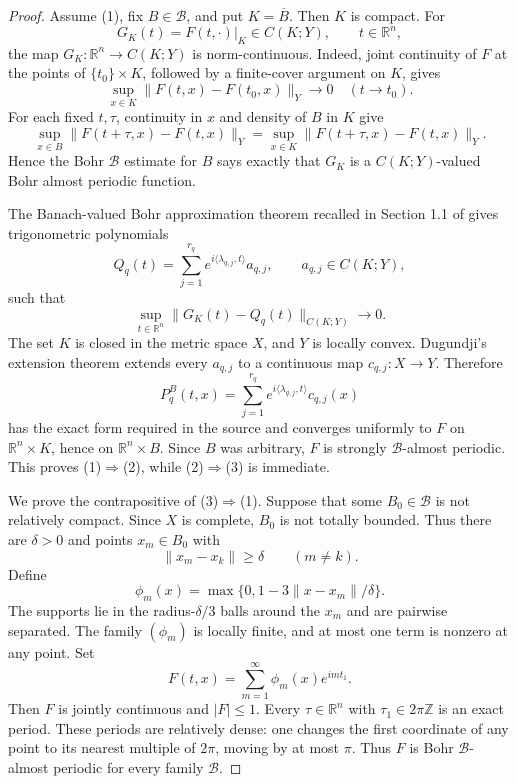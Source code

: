 \documentclass[11pt]{article}
\newcommand{\R}{\mathbb R}
\newcommand{\B}{\mathcal B}
\newcommand{\ip}[2]{\langle #1,#2\rangle}
\begin{document}
\begin{proof}
Assume (1), fix $B\in\B$, and put $K=\overline B$.  Then $K$ is compact.
For
\[
 G_K(t)=F(t,\cdot)|_K\in C(K;Y),\qquad t\in\R^n,
\]
the map $G_K:\R^n\to C(K;Y)$ is norm-continuous.  Indeed, joint continuity
of $F$ at the points of $\{t_0\}\times K$, followed by a finite-cover
argument on $K$, gives
\[
 \sup_{x\in K}\|F(t,x)-F(t_0,x)\|_Y\longrightarrow0
 \quad(t\to t_0).
\]
For each fixed $t,\tau$, continuity in $x$ and density of $B$ in $K$ give
\[
 \sup_{x\in B}\|F(t+\tau,x)-F(t,x)\|_Y
 =\sup_{x\in K}\|F(t+\tau,x)-F(t,x)\|_Y.
\]
Hence the Bohr $\B$ estimate for $B$ says exactly that $G_K$ is a
$C(K;Y)$-valued Bohr almost periodic function.

The Banach-valued Bohr approximation theorem recalled in Section 1.1 of
\cite{CKKP} gives trigonometric polynomials
\[
 Q_q(t)=\sum_{j=1}^{r_q}e^{i\ip{\lambda_{q,j}}{t}}a_{q,j},
 \qquad a_{q,j}\in C(K;Y),
\]
such that
\[
 \sup_{t\in\R^n}\|G_K(t)-Q_q(t)\|_{C(K;Y)}\longrightarrow0.
\]
The set $K$ is closed in the metric space $X$, and $Y$ is locally convex.
Dugundji's extension theorem \cite{Dugundji} extends every $a_{q,j}$ to a
continuous map $c_{q,j}:X\to Y$.  Therefore
\[
 P_q^B(t,x)=\sum_{j=1}^{r_q}
 e^{i\ip{\lambda_{q,j}}{t}}c_{q,j}(x)
\]
has the exact form required in the source and converges uniformly to $F$ on
$\R^n\times K$, hence on $\R^n\times B$.  Since $B$ was arbitrary, $F$ is
strongly $\B$-almost periodic.  This proves (1)$\Rightarrow$(2), while
(2)$\Rightarrow$(3) is immediate.

We prove the contrapositive of (3)$\Rightarrow$(1).  Suppose that some
$B_0\in\B$ is not relatively compact.  Since $X$ is complete, $B_0$ is not
totally bounded.  Thus there are $\delta>0$ and points $x_m\in B_0$ with
\[
 \|x_m-x_k\|\geq\delta\qquad(m\neq k).
\]
Define
\[
 \phi_m(x)=\max\{0,1-3\|x-x_m\|/\delta\}.
\]
The supports lie in the radius-$\delta/3$ balls around the $x_m$ and are
pairwise separated.  The family $(\phi_m)$ is locally finite, and at most one
term is nonzero at any point.  Set
\begin{equation}\label{eq:F}
 F(t,x)=\sum_{m=1}^{\infty}\phi_m(x)e^{imt_1}.
\end{equation}
Then $F$ is jointly continuous and $|F|\leq1$.  Every
$\tau\in\R^n$ with $\tau_1\in2\pi\mathbb Z$ is an exact period.  These
periods are relatively dense: one changes the first coordinate of any point
to its nearest multiple of $2\pi$, moving by at most $\pi$.  Thus $F$ is
Bohr $\B$-almost periodic for every family $\B$.


\end{proof}
\end{document}
